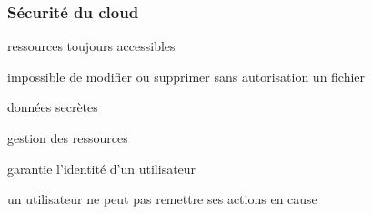 \documentclass{beamer}
\begin{document}
\begin{frame}
\frametitle{Sécurité du cloud}
    \begin{description}[Authentification :]
    \setlength\itemsep{.5cm}
	\item[Disponibilité :] ressources toujours accessibles
	\item[Integrité :] impossible de modifier ou supprimer sans autorisation un fichier
	\item[Confidentialité :] données secrètes
	\item[Contrôle :] gestion des ressources
	\item[Authentification :] garantie l'identité d'un utilisateur
	\item[Non-répudiation :] un utilisateur ne peut pas remettre ses actions en
        cause
\end{description}
\end{frame}


\end{document}
